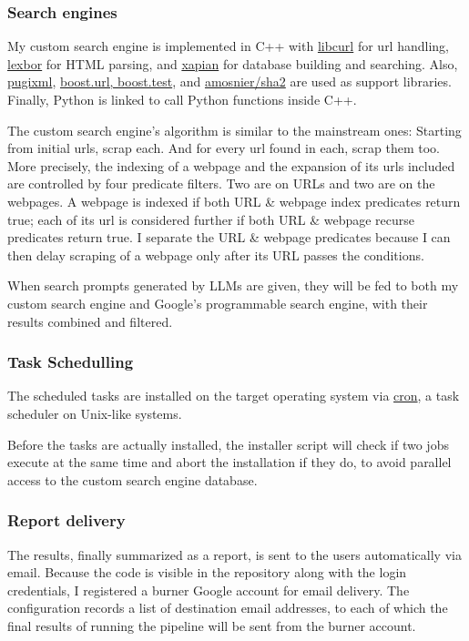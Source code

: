 \documentclass[final-report]{report-template}
\begin{document}
\subsubsection{Search engines}
My custom search engine is implemented in C++ with
\href{https://curl.se/libcurl/}{\ttfamily libcurl} for url handling,
\href{https://lexbor.com/}{\ttfamily lexbor} for HTML parsing, and
\href{https://xapian.org/docs/}{\ttfamily xapian} for database building and
searching. Also, \href{https://pugixml.org/}{\ttfamily pugixml},
\href{https://www.boost.org/}{\ttfamily boost.url, boost.test}, and
\href{https://github.com/amosnier/sha-2}{\ttfamily amosnier/sha2} are used as
support libraries. Finally, Python is linked to call Python functions inside
C++.

The custom search engine's algorithm is similar to the mainstream ones:
Starting from initial urls, scrap each. And for every url found in each, scrap
them too.  More precisely, the indexing of a webpage and the expansion of its
urls included are controlled by four predicate filters. Two are on URLs and two
are on the webpages. A webpage is indexed if both URL \& webpage index
predicates return true; each of its url is considered further if both URL \&
webpage recurse predicates return true. I separate the URL \& webpage
predicates because I can then delay scraping of a webpage only after its URL
passes the conditions.

When search prompts generated by LLMs are given, they will be fed to both my
custom search engine and Google's programmable search engine, with their
results combined and filtered.

\subsubsection{Task Schedulling}
The scheduled tasks are installed on the target operating system via
\href{https://en.wikipedia.org/wiki/Cron}{cron}, a task scheduler on Unix-like
systems.

Before the tasks are actually installed, the installer script will check if two
jobs execute at the same time and abort the installation if they do, to avoid
parallel access to the custom search engine database.

\subsubsection{Report delivery} 
The results, finally summarized as a report, is sent to the users automatically
via email. Because the code is visible in the repository along with the login
credentials, I registered a burner Google account for email delivery. The
configuration records a list of destination email addresses, to each of which
the final results of running the pipeline will be sent from the burner account.
\end{document}
